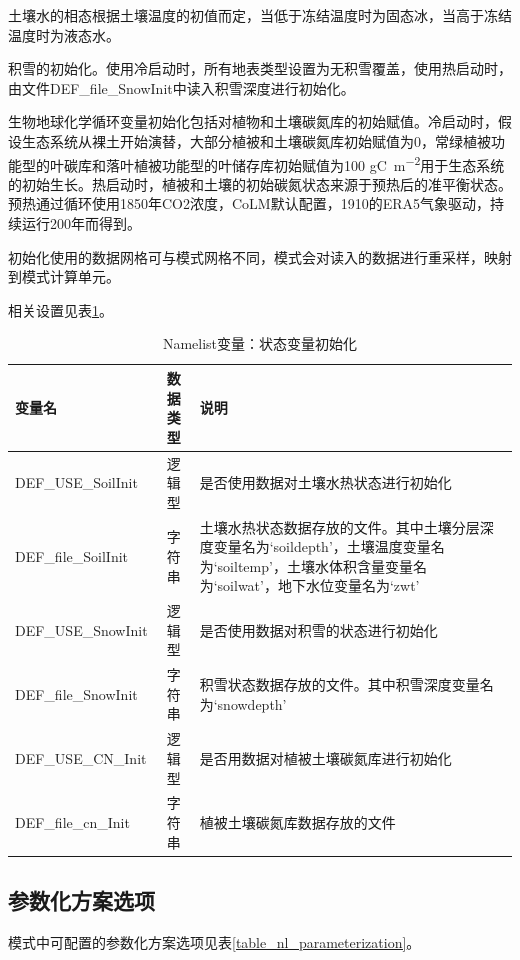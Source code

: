 \documentclass[a4paper,12pt,twoside]{article}
\begin{document}
土壤水的相态根据土壤温度的初值而定，当低于冻结温度时为固态冰，当高于冻结温度时为液态水。

积雪的初始化。使用冷启动时，所有地表类型设置为无积雪覆盖，使用热启动时，由文件DEF\_file\_SnowInit中读入积雪深度进行初始化。

生物地球化学循环变量初始化包括对植物和土壤碳氮库的初始赋值。冷启动时，假设生态系统从裸土开始演替，大部分植被和土壤碳氮库初始赋值为0，常绿植被功能型的叶碳库和落叶植被功能型的叶储存库初始赋值为100  \unit{gC.m^{-2}}用于生态系统的初始生长。热启动时，植被和土壤的初始碳氮状态来源于预热后的准平衡状态。预热通过循环使用1850年CO2浓度，CoLM默认配置，1910的ERA5气象驱动，持续运行200年而得到。

初始化使用的数据网格可与模式网格不同，模式会对读入的数据进行重采样，映射到模式计算单元。

相关设置见表\ref{table_nl_ini}。

\begin{table}[!htbp] \small
\caption{Namelist变量：状态变量初始化}
\label{table_nl_ini}
\centering \renewcommand{\arraystretch}{1.5}
\begin{tabular}{lcp{}}
\toprule
\textbf{变量名} & \textbf{数据类型} & \textbf{说明} \\\midrule
DEF\_USE\_SoilInit & 逻辑型 & 是否使用数据对土壤水热状态进行初始化 \\
DEF\_file\_SoilInit & 字符串 & 土壤水热状态数据存放的文件。其中土壤分层深度变量名为`soildepth'，土壤温度变量名为`soiltemp'，土壤水体积含量变量名为`soilwat'，地下水位变量名为`zwt' \\
DEF\_USE\_SnowInit & 逻辑型 & 是否使用数据对积雪的状态进行初始化 \\
DEF\_file\_SnowInit & 字符串 & 积雪状态数据存放的文件。其中积雪深度变量名为`snowdepth' \\
DEF\_USE\_CN\_Init & 逻辑型 & 是否用数据对植被土壤碳氮库进行初始化 \\
DEF\_file\_cn\_Init & 字符串 & 植被土壤碳氮库数据存放的文件 \\
\bottomrule
\end{tabular} 
\end{table}

\clearpage

\subsection{参数化方案选项}

模式中可配置的参数化方案选项见表\ref{table_nl_parameterization}。
\end{document}
